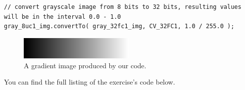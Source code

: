\documentclass[10pt]{article}
\begin{document}
\begin{lstlisting}[style=CStyle,caption={Reading image.},label={lst:cvtcolor}]
// convert grayscale image from 8 bits to 32 bits, resulting values will be in the interval 0.0 - 1.0
gray_8uc1_img.convertTo( gray_32fc1_img, CV_32FC1, 1.0 / 255.0 );
\end{lstlisting}


\begin{figure}[th]
\begin{center}
    \includegraphics[width=0.5\textwidth]{gradient_8uc1_img}
    \caption{A gradient image produced by our code.}
    \label{img:gradient_example}
\end{center}
\end{figure}

You can find the full listing of the exercise's code below.
\end{document}
